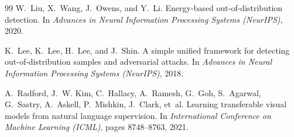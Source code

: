 \documentclass{article}
\begin{document}
\begin{thebibliography}{99}
W.~Liu, X.~Wang, J.~Owens, and Y.~Li.
\newblock Energy-based out-of-distribution detection.
\newblock In \emph{Advances in Neural Information Processing Systems (NeurIPS)}, 2020.

K.~Lee, K.~Lee, H.~Lee, and J.~Shin.
\newblock A simple unified framework for detecting out-of-distribution samples and adversarial attacks.
\newblock In \emph{Advances in Neural Information Processing Systems (NeurIPS)}, 2018.

A.~Radford, J.~W. Kim, C.~Hallacy, A.~Ramesh, G.~Goh, S.~Agarwal, G.~Sastry, A.~Askell, P.~Mishkin, J.~Clark, et~al.
\newblock Learning transferable visual models from natural language supervision.
\newblock In \emph{International Conference on Machine Learning (ICML)}, pages 8748--8763, 2021.

\end{thebibliography}
\end{document}
